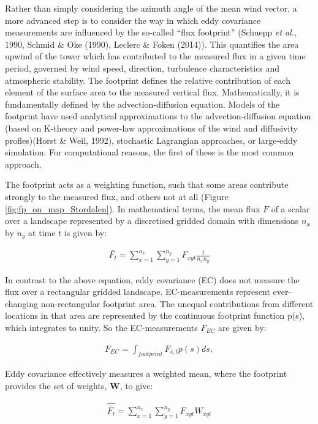 Rather than simply considering the azimuth angle of the mean wind
vector, a more advanced step is to consider the way in which eddy
covariance measurements are influenced by the so-called ``flux
footprint'' (Schuepp \emph{et al.}, 1990, Schmid \& Oke (1990), Leclerc
\& Foken (2014)). This quantifies the area upwind of the tower which has
contributed to the measured flux in a given time period, governed by
wind speed, direction, turbulence characteristics and atmospheric
stability. The footprint defines the relative contribution of each
element of the surface area to the measured vertical flux.
Mathematically, it is fundamentally defined by the advection-diffusion
equation. Models of the footprint have used analytical approximations to
the advection-diffusion equation (based on K-theory and power-law
approximations of the wind and diffusivity profles)(Horst \& Weil,
1992), stochastic Lagrangian approaches, or large-eddy simulation. For
computational reasons, the first of these is the most common approach.

The footprint acts as a weighting function, such that some areas
contribute strongly to the measured flux, and others not at all (Figure
\ref{fig:fp_on_map_Stordalen}). In mathematical terms, the mean flux
\(F\) of a scalar over a landscape represented by a discretised gridded
domain with dimensions \(n_x\) by \(n_y\) at time \(t\) is given by:

\begin{align}   \label{eq:simpleMean}
  \bar{F_t} = \sum_{x = 1}^{n_x} \sum_{y = 1}^{n_y} F_{xyt} \frac{1}{n_x n_y}
\end{align}

In contrast to the above equation, eddy covariance (EC) does not measure the flux over a rectangular gridded landscape. EC-measurements represent ever-changing non-rectangular footprint area. The unequal contributions from different locations in that area are represented by the continuous footprint function p(s), which integrates to unity. So the EC-measurements \(F_{EC}\) are given by:

\begin{align}   \label{eq:EC}
  F_{EC} = \int_{footprint} F_{s,t} p(s) d s,
\end{align}



Eddy covariance effectively measures a weighted mean, where the
footprint provides the set of weights, \(\mathbf{W}\), to give:

\begin{align}   \label{eq:weightMean}
  \widehat{\bar{F_t}} = \sum_{x = 1}^{n_x} \sum_{y = 1}^{n_y} F_{xyt} W_{xyt}
\end{align}

